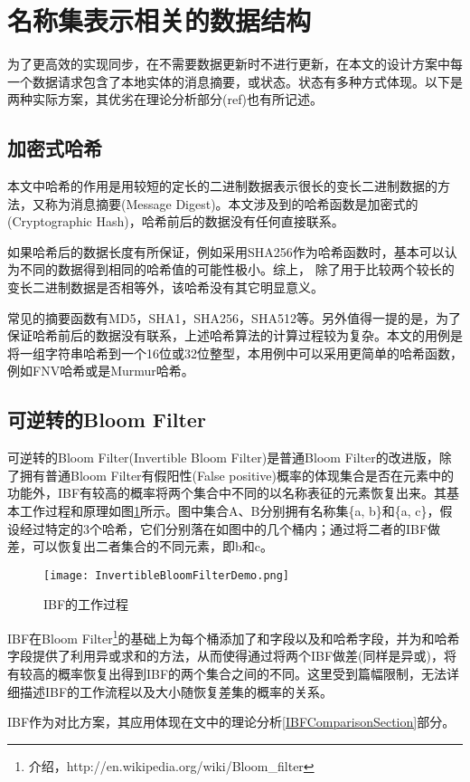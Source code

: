 \section{名称集表示相关的数据结构}
\par
为了更高效的实现同步，在不需要数据更新时不进行更新，在本文的设计方案中每一个数据请求包含了本地实体的消息摘要，或状态。状态有多种方式体现。以下是两种实际方案，其优劣在理论分析部分(ref)也有所记述。
\subsection*{加密式哈希}
\par
本文中哈希的作用是用较短的定长的二进制数据表示很长的变长二进制数据的方法，又称为消息摘要(Message Digest)。本文涉及到的哈希函数是加密式的(Cryptographic Hash)，哈希前后的数据没有任何直接联系。
\par
如果哈希后的数据长度有所保证，例如采用SHA256作为哈希函数时，基本可以认为不同的数据得到相同的哈希值的可能性极小。综上， 除了用于比较两个较长的变长二进制数据是否相等外，该哈希没有其它明显意义。
\par
常见的摘要函数有MD5，SHA1，SHA256，SHA512等。另外值得一提的是，为了保证哈希前后的数据没有联系，上述哈希算法的计算过程较为复杂。本文的用例是将一组字符串哈希到一个16位或32位整型，本用例中可以采用更简单的哈希函数，例如FNV哈希或是Murmur哈希。
\subsection*{可逆转的Bloom Filter}
\label{IBFIntroSection}
\par
可逆转的Bloom Filter(Invertible Bloom Filter)\cite{IBFRef}是普通Bloom Filter的改进版，除了拥有普通Bloom Filter有假阳性(False positive)概率的体现集合是否在元素中的功能外，IBF有较高的概率将两个集合中不同的以名称表征的元素恢复出来。其基本工作过程和原理如图\ref{fig:IBF}所示。图中集合A、B分别拥有名称集\{a, b\}和\{a, c\}，假设经过特定的3个哈希，它们分别落在如图中的几个桶内；通过将二者的IBF做差，可以恢复出二者集合的不同元素，即b和c。
\begin{figure}[h!]
	\centering
	\texttt{[image: InvertibleBloomFilterDemo.png]}
	\caption{IBF的工作过程}
	\label{fig:IBF}
\end{figure}
\par
IBF在Bloom Filter\footnote{介绍，http://en.wikipedia.org/wiki/Bloom\_filter}的基础上为每个桶添加了和字段以及和哈希字段，并为和哈希字段提供了利用异或求和的方法，从而使得通过将两个IBF做差(同样是异或)，将有较高的概率恢复出得到IBF的两个集合之间的不同。这里受到篇幅限制，无法详细描述IBF的工作流程以及大小随恢复差集的概率的关系。
\par
IBF作为对比方案，其应用体现在文中的理论分析\ref{IBFComparisonSection}部分。
